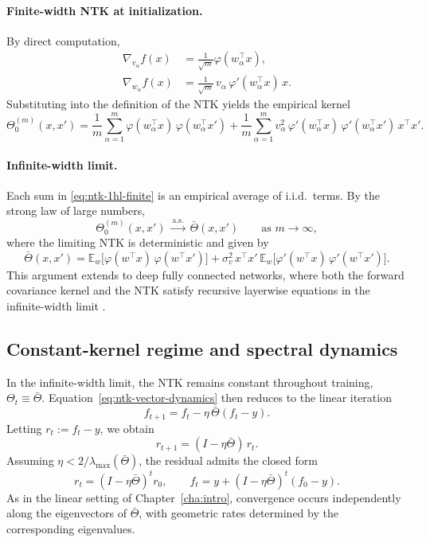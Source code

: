\paragraph{Finite-width NTK at initialization.}
By direct computation,
\begin{align}
	\nabla_{v_\alpha} f(x)
	 & = \frac{1}{\sqrt{m}}\varphi(w_\alpha^\top x),                 \\
	\nabla_{w_\alpha} f(x)
	 & = \frac{1}{\sqrt{m}}\,v_\alpha\,\varphi'(w_\alpha^\top x)\,x.
\end{align}
Substituting into the definition of the NTK yields the empirical kernel
\begin{equation}
	\Theta_0^{(m)}(x,x')
	=
	\frac{1}{m}\sum_{\alpha=1}^m
	\varphi(w_\alpha^\top x)\,\varphi(w_\alpha^\top x')
	+
	\frac{1}{m}\sum_{\alpha=1}^m
	v_\alpha^2\,
	\varphi'(w_\alpha^\top x)\,
	\varphi'(w_\alpha^\top x')\,
	x^\top x'.
	\label{eq:ntk-1hl-finite}
\end{equation}

\paragraph{Infinite-width limit.}
Each sum in \eqref{eq:ntk-1hl-finite} is an empirical average of i.i.d.\ terms.
By the strong law of large numbers,
\[
	\Theta_0^{(m)}(x,x')
	\;\xrightarrow{\text{a.s.}}\;
	\bar\Theta(x,x')
	\qquad \text{as } m \to \infty,
\]
where the limiting NTK is deterministic and given by
\begin{equation}
	\bar\Theta(x,x')
	=
	\mathbb{E}_{w}\!\big[\varphi(w^\top x)\,\varphi(w^\top x')\big]
	+
	\sigma_v^2\,x^\top x'\,
	\mathbb{E}_{w}\!\big[\varphi'(w^\top x)\,\varphi'(w^\top x')\big].
	\label{eq:ntk-1hl-infinite}
\end{equation}
This argument extends to deep fully connected networks, where both the forward
covariance kernel and the NTK satisfy recursive layerwise equations in the
infinite-width limit \citep{jacot2018ntk, lee2020wide}.

\subsection{Constant-kernel regime and spectral dynamics}

In the infinite-width limit, the NTK remains constant throughout training,
$\Theta_t \equiv \bar\Theta$. Equation~\eqref{eq:ntk-vector-dynamics} then reduces
to the linear iteration
\begin{equation}
	f_{t+1} = f_t - \eta\,\bar\Theta (f_t - y).
	\label{eq:ntk-constant-kernel}
\end{equation}
Letting $r_t := f_t - y$, we obtain
\[
	r_{t+1} = (I - \eta \bar\Theta)\,r_t.
\]
Assuming $\eta < 2/\lambda_{\max}(\bar\Theta)$, the residual admits the closed
form
\begin{equation}
	r_t = (I - \eta \bar\Theta)^t r_0,
	\qquad
	f_t = y + (I - \eta \bar\Theta)^t (f_0 - y).
	\label{eq:ntk-solution}
\end{equation}
As in the linear setting of Chapter~\ref{cha:intro}, convergence occurs
independently along the eigenvectors of $\bar\Theta$, with geometric rates
determined by the corresponding eigenvalues.


